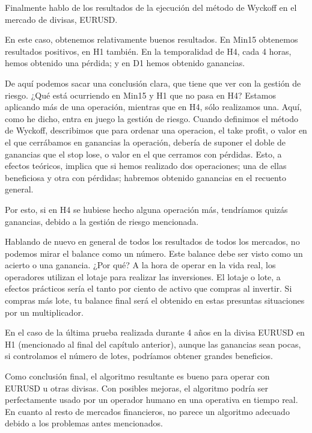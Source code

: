 Finalmente hablo de los resultados de la ejecución del método de Wyckoff en el mercado de divisas, EURUSD.\newline

En este caso, obtenemos relativamente buenos resultados. En Min15 obtenemos resultados positivos, en H1 también. En la temporalidad de H4, cada 4 horas, hemos obtenido una pérdida; y en D1 hemos obtenido ganancias.\newline

De aquí podemos sacar una conclusión clara, que tiene que ver con la gestión de riesgo. ¿Qué está ocurriendo en Min15 y H1 que no pasa en H4? Estamos aplicando más de una operación, mientras que en H4, sólo realizamos una. Aquí, como he dicho, entra en juego la gestión de riesgo. Cuando definimos el método de Wyckoff, describimos que para ordenar una operacion, el take profit, o valor en el que cerrábamos en ganancias la operación, debería de suponer el doble de ganancias que el stop lose, o valor en el que cerramos con pérdidas. Esto, a efectos teóricos, implica que si hemos realizado dos operaciones; una de ellas beneficiosa y otra con pérdidas; habremos obtenido ganancias en el recuento general.\newline

Por esto, si en H4 se hubiese hecho alguna operación más, tendríamos quizás ganancias, debido a la gestión de riesgo mencionada.\newline

Hablando de nuevo en general de todos los resultados de todos los mercados, no podemos mirar el balance como un número. Este balance debe ser visto como un acierto o una ganancia. ¿Por qué? A la hora de operar en la vida real, los operadores utilizan el lotaje para realizar las inversiones. El lotaje o lote, a efectos prácticos sería el tanto por ciento de activo que compras al invertir. Si compras más lote, tu balance final será el obtenido en estas presuntas situaciones por un multiplicador.\newline

En el caso de la última prueba realizada durante 4 años en la divisa EURUSD en H1 (mencionado al final del capítulo anterior), aunque las ganancias sean pocas, si controlamos el número de lotes, podríamos obtener grandes beneficios. \newline

Como conclusión final, el algoritmo resultante es bueno para operar con EURUSD u otras divisas. Con posibles mejoras, el algoritmo podría ser perfectamente usado por un operador humano en una operativa en tiempo real. En cuanto al resto de mercados financieros, no parece un algoritmo adecuado debido a los problemas antes mencionados. \newline

